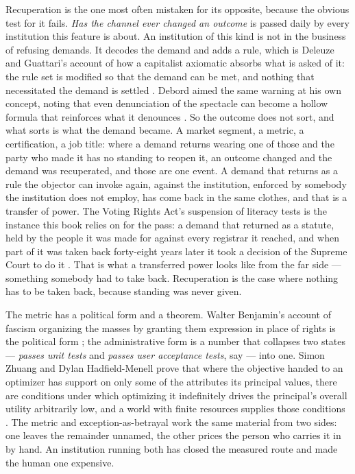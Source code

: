 Recuperation is the one most often mistaken for its opposite, because the obvious test for it fails. \emph{Has the channel ever changed an outcome} is passed daily by every institution this feature is about. An institution of this kind is not in the business of refusing demands. It decodes the demand and adds a rule, which is Deleuze and Guattari's account of how a capitalist axiomatic absorbs what is asked of it: the rule set is modified so that the demand can be met, and nothing that necessitated the demand is settled \autocite[Plateau~13]{deleuze1987plateaus}. Debord aimed the same warning at his own concept, noting that even denunciation of the spectacle can become a hollow formula that reinforces what it denounces \autocite{debord1967spectacle}. So the outcome does not sort, and what sorts is what the demand became. A market segment, a metric, a certification, a job title: where a demand returns wearing one of those and the party who made it has no standing to reopen it, an outcome changed and the demand was recuperated, and those are one event. A demand that returns as a rule the objector can invoke again, against the institution, enforced by somebody the institution does not employ, has come back in the same clothes, and that is a transfer of power. The Voting Rights Act's suspension of literacy tests is the instance this book relies on for the pass: a demand that returned as a statute, held by the people it was made for against every registrar it reached, and when part of it was taken back forty-eight years later it took a decision of the Supreme Court to do it \autocite{shelby2013}. That is what a transferred power looks like from the far side — something somebody had to take back. Recuperation is the case where nothing has to be taken back, because standing was never given.

The metric has a political form and a theorem. Walter Benjamin's account of fascism organizing the masses by granting them expression in place of rights is the political form \autocite{benjamin1935artwork}; the administrative form is a number that collapses two states — \emph{passes unit tests} and \emph{passes user acceptance tests}, say — into one. Simon Zhuang and Dylan Hadfield-Menell prove that where the objective handed to an optimizer has support on only some of the attributes its principal values, there are conditions under which optimizing it indefinitely drives the principal's overall utility arbitrarily low, and a world with finite resources supplies those conditions \autocite{zhuang2020consequences}. The metric and exception-as-betrayal work the same material from two sides: one leaves the remainder unnamed, the other prices the person who carries it in by hand. An institution running both has closed the measured route and made the human one expensive.

